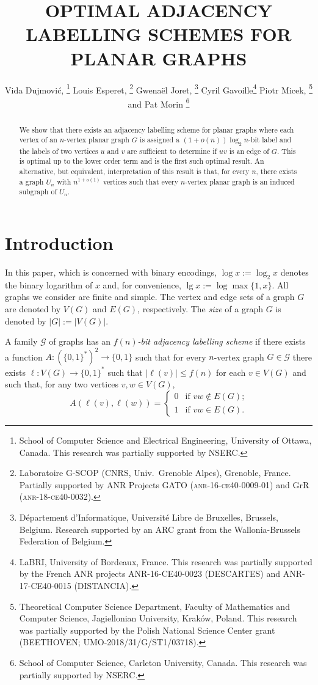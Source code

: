 \documentclass[kpfonts]{patmorin}
\title{\MakeUppercase{Optimal Adjacency Labelling Schemes for Planar Graphs}}
\author{
  Vida Dujmović,%
    \thanks{School of Computer Science and Electrical Engineering, University of Ottawa, Canada. This research was partially supported by NSERC.}\quad
  Louis Esperet,%
    \thanks{Laboratoire G-SCOP (CNRS, Univ.\ Grenoble Alpes), Grenoble, France. Partially supported by ANR Projects GATO (\textsc{anr-16-ce40-0009-01}) and GrR (\textsc{anr-18-ce40-0032}).}\quad
  Gwenaël Joret,%
    \thanks{Département d'Informatique, Université Libre de Bruxelles, Brussels, Belgium. Research supported by an ARC grant from the Wallonia-Brussels Federation of Belgium.}\quad
    Cyril Gavoille\thanks{LaBRI, University of Bordeaux, France. This research was partially supported by the French ANR projects ANR-16-CE40-0023 (DESCARTES) and ANR-17-CE40-0015 (DISTANCIA).}\quad
  Piotr Micek,%
    \thanks{Theoretical Computer Science Department, Faculty of Mathematics and Computer Science, Jagiellonian University, Krak\'{o}w, Poland. This research was partially supported by the Polish National Science Center grant (BEETHOVEN; UMO-2018/31/G/ST1/03718).}\newline
  and Pat Morin%
    \thanks{School of Computer Science, Carleton University, Canada. This research was partially supported by NSERC.}
}
\let\le\leqslant
\begin{document}
\begin{titlepage}
\maketitle

\begin{abstract}
  We show that there exists an adjacency labelling scheme for planar graphs where each vertex of an $n$-vertex planar graph $G$ is assigned a $(1+o(n))\log_2 n$-bit label and the labels of two vertices $u$ and $v$ are sufficient to determine if $uv$ is an edge of $G$.  This is optimal up to the lower order term and is the first such optimal result.  An alternative, but equivalent, interpretation of this result is that, for every $n$, there exists a graph $U_n$ with $n^{1+o(1)}$ vertices such that every $n$-vertex planar graph is an induced subgraph of $U_n$.  
%  
\end{abstract}
\end{titlepage}
\tableofcontents

\newpage

\setcounter{page}{0}
\section{Introduction}

In this paper, which is concerned with binary encodings, $\log x:=\log_2 x$ denotes the binary logarithm of $x$ and, for convenience, $\lg x := \log\max\{1,x\}$.  All graphs we consider are finite and simple.  The vertex and edge sets of a graph $G$ are denoted by $V(G)$ and $E(G)$, respectively.  The \emph{size} of a graph $G$ is denoted by $|G|:=|V(G)|$.

A family $\mathcal{G}$ of graphs has an \emph{$f(n)$-bit adjacency labelling scheme} if there exists a function $A:(\{0,1\}^*)^2\to \{0,1\}$ such that for every $n$-vertex graph $G\in \mathcal{G}$ there exists $\ell:V(G)\to\{0,1\}^*$ such that $|\ell(v)|\le f(n)$ for each $v\in V(G)$ and such that, for any two vertices $v,w\in V(G)$,
\[  A(\ell(v),\ell(w)) = 
      \begin{cases} 
        0 & \text{if $vw\not\in E(G)$;} \\
        1 & \text{if $vw\in E(G)$.}
      \end{cases}
\]
\end{document}
